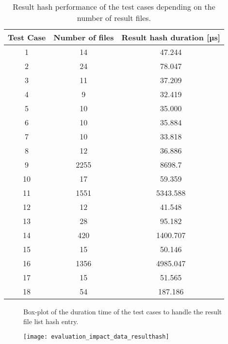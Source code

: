 \documentclass[draft,final]{vutinfth} %
\begin{document}
\begin{itemize}
\begin{table}[]
	\caption{Result hash performance of the test cases depending on the number of result files.}
	\begin{tabular}{c|c|c}
		\textbf{Test Case} & \textbf{Number of files} & \textbf{Result hash duration [µs]}  \\ \hline
		1 & 14  & 47.244 \\ \hline 
		2 & 24 & 78.047 \\ \hline
		3 & 11 & 37.209 \\ \hline
		4 & 9 & 32.419 \\ \hline
		5 & 10 & 35.000 \\ \hline
		6 & 10 & 35.884 \\ \hline
		7 & 10 & 33.818 \\ \hline
		8 & 12 & 36.886 \\ \hline
		9 & 2255 & 8698.7 \\ \hline
		10 & 17 & 59.359 \\ \hline
		11 & 1551 & 5343.588 \\ \hline
		12 & 12 & 41.548 \\ \hline
		13 & 28 & 95.182 \\ \hline
		14 & 420 & 1400.707 \\ \hline
		15 & 15 & 50.146 \\ \hline
		16 & 1356 & 4985.047 \\ \hline
		17 & 15 & 51.565 \\ \hline
		18 & 54 & 187.186 \\ 
	\end{tabular}
	\label{Tab:data_result_hash}
\end{table}
\begin{figure}[!h]
	\centering
	\caption{Box-plot of the duration time of the test cases to handle the result file list hash entry.}
	\label{fig:evaluation_perf_result_hash}
\end{figure}
\begin{figure}[h]
	\centering
	\texttt{[image: evaluation\_impact\_data\_resulthash]}

\end{figure}
\end{itemize}
\end{document}

